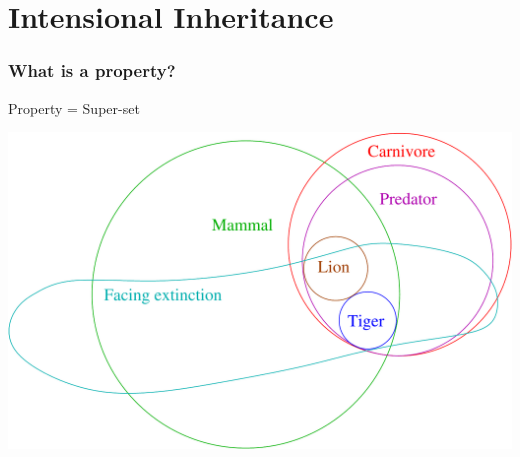 \documentclass{beamer}
\begin{document}
\section{Intensional Inheritance}

\frame
{
  \frametitle{What is a property?}

  \begin{center}
      Property = Super-set

      \includegraphics[scale=0.35]{property_superset.pdf}
  
  \end{center}


}
\end{document}
